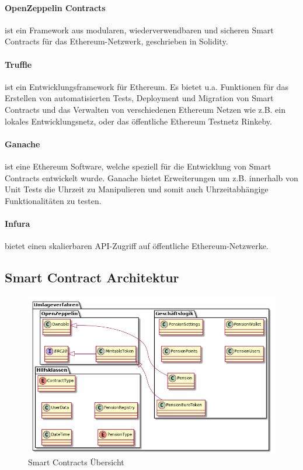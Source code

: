 \paragraph*{OpenZeppelin Contracts} ist ein Framework aus modularen, wiederverwendbaren und sicheren Smart Contracts für das Ethereum-Netzwerk, geschrieben in Solidity.

\paragraph*{Truffle} ist ein Entwicklungsframework für Ethereum. Es bietet u.a. Funktionen für das Erstellen von automatisierten Tests, Deployment und Migration von Smart Contracts und das Verwalten von verschiedenen Ethereum Netzen wie z.B. ein lokales Entwicklungsnetz, oder das öffentliche Ethereum Testnetz Rinkeby.

\paragraph*{Ganache} ist eine Ethereum Software, welche speziell für die Entwicklung von Smart Contracts entwickelt wurde. Ganache bietet Erweiterungen um z.B. innerhalb von Unit Tests die Uhrzeit zu Manipulieren und somit auch Uhrzeitabhängige Funktionalitäten zu testen.

\paragraph*{Infura} bietet einen skalierbaren API-Zugriff auf öffentliche Ethereum-Netzwerke.


\subsection{Smart Contract Architektur}

\begin{figure}[H]
    \centering
    \includegraphics[width=6.0in]{images/classdiagram-smartcontracts.png}
    \caption{Smart Contracts Übersicht}
    \label{fig:asure_architecture}
\end{figure}



